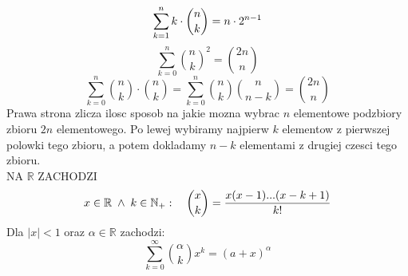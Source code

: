 \documentclass{article}
\newcommand{\R}{\mathbb{R}}
\newcommand{\N}{\mathbb{N}}
\begin{document}
  $$\sum\limits_{k=1}^nk\cdot{n\choose k}=n\cdot2^{n-1}\medskip$$
  $$\sum\limits_{k=0}^n{n\choose k}^2={2n\choose n}$$
  $$\sum\limits_{k=0}^n{n\choose k}\cdot{n\choose k}=\sum\limits_{k=0}^n{n\choose k}{n\choose n-k}={2n\choose n}$$
  Prawa strona zlicza ilosc sposob na jakie mozna wybrac $n$ elementowe podzbiory zbioru $2n$ elementowego. Po lewej wybiramy najpierw $k$ elementow z pierwszej polowki tego zbioru, a potem dokladamy $n-k$ elementami z drugiej czesci tego zbioru.\bigskip\\
  \color{def}NA $\R$ ZACHODZI\color{txt}\\
  $$x\in\R \;\land\; k\in\N_+: \quad {x\choose k}= {x(x-1)...(x-k+1)\over k!}$$
  Dla $|x|<1$ oraz $\alpha\in\R$ zachodzi:
  $$\sum\limits_{k=0}^\infty {\alpha\choose k}x^k=(a+x)^\alpha$$
\end{document}
